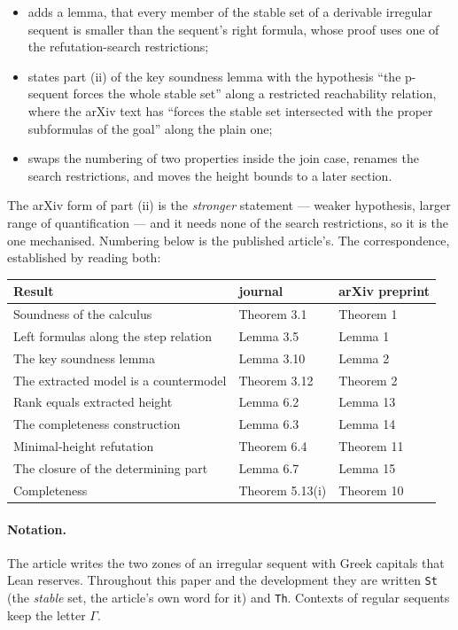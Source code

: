 \documentclass[11pt,a4paper]{article}
\begin{document}
\begin{itemize}
\item adds a lemma, that every member of the stable set of a derivable
  irregular sequent is smaller than the sequent's right formula, whose
  proof uses one of the refutation-search restrictions;
\item states part (ii) of the key soundness lemma with the hypothesis
  ``the p-sequent forces the whole stable set'' along a restricted
  reachability relation, where the arXiv text has ``forces the stable set
  intersected with the proper subformulas of the goal'' along the plain
  one;
\item swaps the numbering of two properties inside the join case, renames
  the search restrictions, and moves the height bounds to a later section.
\end{itemize}

The arXiv form of part (ii) is the \emph{stronger} statement --- weaker
hypothesis, larger range of quantification --- and it needs none of the
search restrictions, so it is the one mechanised. Numbering below is the
published article's. The correspondence, established by reading both:

\begin{center}
\begin{tabular}{lll}
\hline
Result & journal & arXiv preprint\\
\hline
Soundness of the calculus & Theorem 3.1 & Theorem 1\\
Left formulas along the step relation & Lemma 3.5 & Lemma 1\\
The key soundness lemma & Lemma 3.10 & Lemma 2\\
The extracted model is a countermodel & Theorem 3.12 & Theorem 2\\
Rank equals extracted height & Lemma 6.2 & Lemma 13\\
The completeness construction & Lemma 6.3 & Lemma 14\\
Minimal-height refutation & Theorem 6.4 & Theorem 11\\
The closure of the determining part & Lemma 6.7 & Lemma 15\\
Completeness & Theorem 5.13(i) & Theorem 10\\
\hline
\end{tabular}
\end{center}

\paragraph{Notation.} The article writes the two zones of an irregular
sequent with Greek capitals that Lean reserves. Throughout this paper and
the development they are written \texttt{St} (the \emph{stable} set, the
article's own word for it) and \texttt{Th}. Contexts of regular sequents
keep the letter $\Gamma$.
\end{document}
